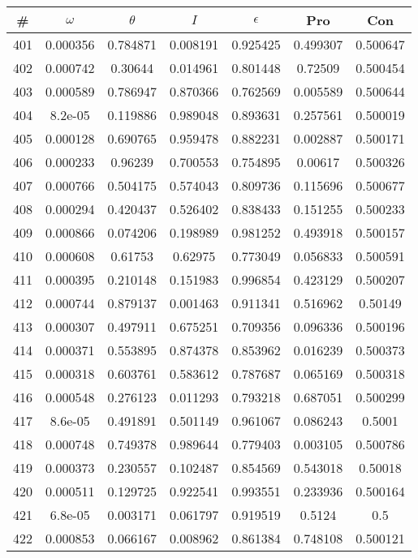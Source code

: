 \newpage
\begin{table}
\begin{tabular}{c|c|c|c|c|c|c}
\# & $\omega$ & $\theta$ & $I$ & $\epsilon$ & Pro & Con\\
\hline
401 & 0.000356 & 0.784871 & 0.008191 & 0.925425 & 0.499307 & 0.500647\\
402 & 0.000742 & 0.30644 & 0.014961 & 0.801448 & 0.72509 & 0.500454\\
403 & 0.000589 & 0.786947 & 0.870366 & 0.762569 & 0.005589 & 0.500644\\
404 & 8.2e-05 & 0.119886 & 0.989048 & 0.893631 & 0.257561 & 0.500019\\
405 & 0.000128 & 0.690765 & 0.959478 & 0.882231 & 0.002887 & 0.500171\\
406 & 0.000233 & 0.96239 & 0.700553 & 0.754895 & 0.00617 & 0.500326\\
407 & 0.000766 & 0.504175 & 0.574043 & 0.809736 & 0.115696 & 0.500677\\
408 & 0.000294 & 0.420437 & 0.526402 & 0.838433 & 0.151255 & 0.500233\\
409 & 0.000866 & 0.074206 & 0.198989 & 0.981252 & 0.493918 & 0.500157\\
410 & 0.000608 & 0.61753 & 0.62975 & 0.773049 & 0.056833 & 0.500591\\
411 & 0.000395 & 0.210148 & 0.151983 & 0.996854 & 0.423129 & 0.500207\\
412 & 0.000744 & 0.879137 & 0.001463 & 0.911341 & 0.516962 & 0.50149\\
413 & 0.000307 & 0.497911 & 0.675251 & 0.709356 & 0.096336 & 0.500196\\
414 & 0.000371 & 0.553895 & 0.874378 & 0.853962 & 0.016239 & 0.500373\\
415 & 0.000318 & 0.603761 & 0.583612 & 0.787687 & 0.065169 & 0.500318\\
416 & 0.000548 & 0.276123 & 0.011293 & 0.793218 & 0.687051 & 0.500299\\
417 & 8.6e-05 & 0.491891 & 0.501149 & 0.961067 & 0.086243 & 0.5001\\
418 & 0.000748 & 0.749378 & 0.989644 & 0.779403 & 0.003105 & 0.500786\\
419 & 0.000373 & 0.230557 & 0.102487 & 0.854569 & 0.543018 & 0.50018\\
420 & 0.000511 & 0.129725 & 0.922541 & 0.993551 & 0.233936 & 0.500164\\
421 & 6.8e-05 & 0.003171 & 0.061797 & 0.919519 & 0.5124 & 0.5\\
422 & 0.000853 & 0.066167 & 0.008962 & 0.861384 & 0.748108 & 0.500121\\

\end{tabular}
\end{table}

